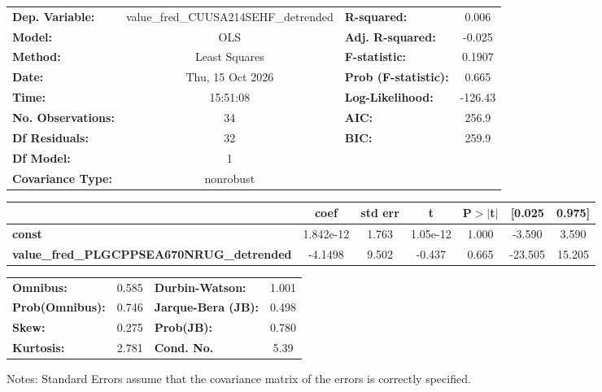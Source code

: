 \begin{center}
\begin{tabular}{lclc}
\toprule
\textbf{Dep. Variable:}                           & value\_fred\_CUUSA214SEHF\_detrended & \textbf{  R-squared:         } &     0.006   \\
\textbf{Model:}                                   &                 OLS                  & \textbf{  Adj. R-squared:    } &    -0.025   \\
\textbf{Method:}                                  &            Least Squares             & \textbf{  F-statistic:       } &    0.1907   \\
\textbf{Date:}                                    &           Thu, 15 Oct 2026           & \textbf{  Prob (F-statistic):} &    0.665    \\
\textbf{Time:}                                    &               15:51:08               & \textbf{  Log-Likelihood:    } &   -126.43   \\
\textbf{No. Observations:}                        &                    34                & \textbf{  AIC:               } &     256.9   \\
\textbf{Df Residuals:}                            &                    32                & \textbf{  BIC:               } &     259.9   \\
\textbf{Df Model:}                                &                     1                & \textbf{                     } &             \\
\textbf{Covariance Type:}                         &              nonrobust               & \textbf{                     } &             \\
\bottomrule
\end{tabular}
\begin{tabular}{lcccccc}
                                                  & \textbf{coef} & \textbf{std err} & \textbf{t} & \textbf{P$> |$t$|$} & \textbf{[0.025} & \textbf{0.975]}  \\
\midrule
\textbf{const}                                    &    1.842e-12  &        1.763     &  1.05e-12  &         1.000        &       -3.590    &        3.590     \\
\textbf{value\_fred\_PLGCPPSEA670NRUG\_detrended} &      -4.1498  &        9.502     &    -0.437  &         0.665        &      -23.505    &       15.205     \\
\bottomrule
\end{tabular}
\begin{tabular}{lclc}
\textbf{Omnibus:}       &  0.585 & \textbf{  Durbin-Watson:     } &    1.001  \\
\textbf{Prob(Omnibus):} &  0.746 & \textbf{  Jarque-Bera (JB):  } &    0.498  \\
\textbf{Skew:}          &  0.275 & \textbf{  Prob(JB):          } &    0.780  \\
\textbf{Kurtosis:}      &  2.781 & \textbf{  Cond. No.          } &     5.39  \\
\bottomrule
\end{tabular}
\end{center}

Notes: \newline
 [1] Standard Errors assume that the covariance matrix of the errors is correctly specified.